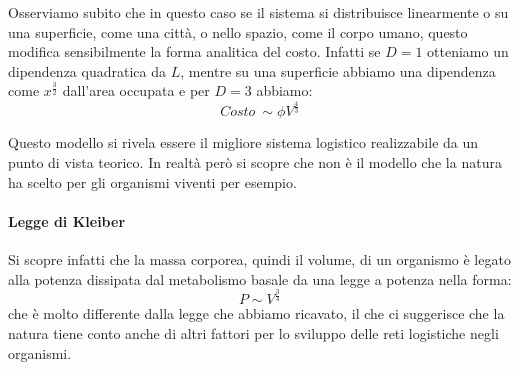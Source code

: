 Osserviamo subito che in questo caso se il sistema si distribuisce linearmente o su una superficie, come una città, o nello spazio, come il corpo umano, questo modifica sensibilmente la forma analitica del costo. Infatti se $D=1$ otteniamo un dipendenza quadratica da $L$, mentre su una superficie abbiamo una dipendenza come $x^{\frac{3}{2}}$ dall'area occupata e per $D=3$ abbiamo:
\begin{equation}
	Costo\ \sim \phi V^{\frac{4}{3}} \label{modelloRaggieraTeorico}
\end{equation}

Questo modello si rivela essere il migliore sistema logistico realizzabile da un punto di vista teorico. In realtà però si scopre che non è il modello che la natura ha scelto per gli organismi viventi per esempio. 
\paragraph{Legge di Kleiber}
Si scopre infatti che la massa corporea, quindi il volume, di un organismo è legato alla potenza dissipata dal metabolismo basale da una legge a potenza nella forma:
\begin{equation}
	P\sim V^{\frac{3}{4}}
\end{equation}
che è molto differente dalla legge che abbiamo ricavato, il che ci suggerisce che la natura tiene conto anche di altri fattori per lo sviluppo delle reti logistiche negli organismi.
